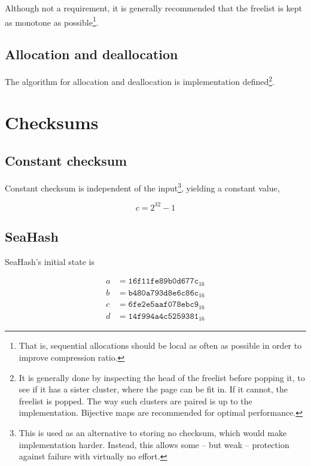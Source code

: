 \documentclass[11pt,a4paper]{report}
\begin{document}
        Although not a requirement, it is generally recommended that
        the freelist is kept as monotone as possible\footnote{That is,
        sequential allocations should be local as often as possible in
        order to improve compression ratio.}.

        \subsection{Allocation and deallocation}
        The algorithm for allocation and deallocation is implementation
        defined\footnote{It is generally done by inspecting the head of the
            freelist before popping it, to see if it has a sister cluster,
            where the page can be fit in. If it cannot, the freelist is popped.
            The way such clusters are paired is up to the implementation.
            Bijective maps are recommended for optimal performance.}.

    \section{Checksums}
        \subsection{Constant checksum}
        \label{checksum:constant}
        Constant checksum is independent of the input\footnote{This is used as
        an alternative to storing no checksum, which would make implementation
        harder. Instead, this allows some -- but weak -- protection against failure
        with virtually no effort.}, yielding a constant value,

        $$c = 2^{32} - 1$$

        \subsection{SeaHash}
        \label{checksum:seahash}
        SeaHash's initial state is

        \begin{align*}
            a &= \texttt{16f11fe89b0d677c}_{16} \\
            b &= \texttt{b480a793d8e6c86c}_{16} \\
            c &= \texttt{6fe2e5aaf078ebc9}_{16} \\
            d &= \texttt{14f994a4c5259381}_{16}
        \end{align*}
\end{document}
